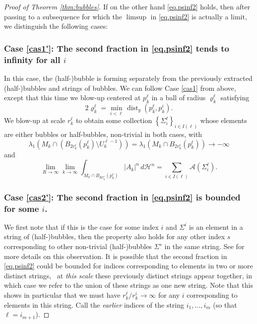\documentclass[10pt]{amsart}
\let\mathcal\mathscr
\newcounter{cas}
\renewcommand{\thecas}{\Roman{cas}}
\DeclareMathOperator{\dist}{dist}
\theoremstyle{definition}
\newcommand{\h}{\mathscr{H}}
\begin{document}
\begin{proof}[Proof of Theorem \ref{thm:bubbles}]
If on the other hand \eqref{eq.psinf2} holds, then after passing to a subsequence for which the $\limsup$ in \eqref{eq.psinf2} is actually a limit, we distinguish the following cases:

\renewcommand{\thecas}{\arabic{cas}$'$}
\subsubsection*{\label{cas1'}Case \ref{cas1'}: The second fraction in \eqref{eq.psinf2} tends to infinity for all $i$} In this case, the \hbox{(half-)}bubble is forming separately from the previously extracted (half-)bubbles and strings of bubbles. We can follow Case \ref{cas1} from above, except that this time we blow-up centered at $p^\ell_k$ in a ball of radius $\varrho^\ell_k$ satisfying
$$2\varrho^\ell_k = \min_{i<\ell} \dist_g(p^\ell_k, p^i_k).$$ We blow-up at scale $r^\ell_k$ to obtain some collection $\left\{\Sigma^\ell_i\right\}_{i\in I(\ell)}$ whose elements are either bubbles or half-bubbles, non-trivial in both cases, with
$$\lambda_1(M_k \cap (B_{2r^\ell_k}(p^\ell_k)\setminus U^{\ell-1}_k))=\lambda_1(M_k\cap B_{2r^\ell_k}(p^\ell_k))\to -\infty$$ and
\begin{equation}\label{eq.lthbubble1}
\lim_{R\to \infty} \lim_{k\to \infty} \int_{M_k\cap B_{Rr^\ell_k}(p^\ell_k)} |A_k|^n \,d\h^n = \sum_{i\in I(\ell)}\mathcal{A}(\Sigma^\ell_i).
\end{equation}

\subsubsection*{\label{cas2'}Case \ref{cas2'}: The second fraction in \eqref{eq.psinf2} is bounded for some $i$.} We first note that if this is the case for some index $i$ and $\Sigma^i$ is an element in a string of (half-)bubbles, then the property also holds for any other index $s$ corresponding to other non-trivial \hbox{(half-)}bubbles $\Sigma^s$ in the same string. See \cite[p.\,4389]{BS17} for more details on this observation. It is possible that the second fraction in \eqref{eq.psinf2} could be bounded for indices corresponding to elements in two or more distinct strings, \ie ~at \emph{this scale} these previously distinct strings appear together, in which case we refer to the union of these strings as one new string. Note that this shows in particular that we must have $r^\ell_k/r^i_k\to \infty$ for any $i$ corresponding to elements in this string. Call the \emph{earlier} indices of the string $i_1,\ldots,i_m$ (so that $\ell=i_{m+1}$).
\addtocounter{cas}{-2}%


\end{proof}
\end{document}
